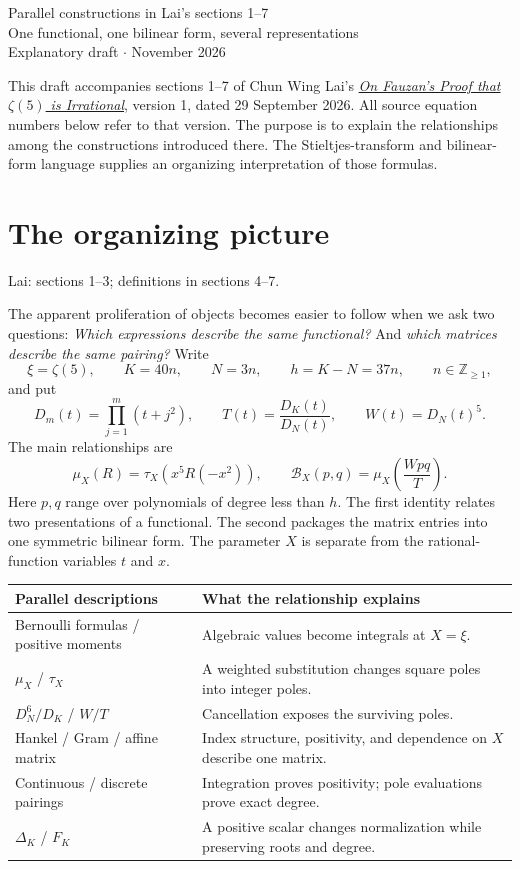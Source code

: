 \documentclass[11pt]{article}
\newcommand{\Z}{\mathbb Z}
\newcommand{\Bcal}{\mathcal B}
\newcommand{\source}[1]{{\small\color{blue!45!black}Lai: #1.}\par}
\newcommand{\pagetitle}[2]{\section*{#1}\source{#2}}
\begin{document}
\begin{center}
{\LARGE Parallel constructions in Lai's sections 1--7}\\[8pt]
{\large One functional, one bilinear form, several representations}\\[6pt]
Explanatory draft \enspace$\cdot$ November 2026
\end{center}

This draft accompanies sections 1--7 of Chun Wing Lai's
\href{https://ai.vixra.org/pdf/2609.0080v1.pdf}{\emph{On Fauzan's Proof that
$\zeta(5)$ is Irrational}}, version 1, dated 29 September 2026.
All source equation numbers below refer to that version. The purpose is to
explain the relationships among the constructions introduced there.
The Stieltjes-transform and bilinear-form language supplies an organizing
interpretation of those formulas.

\pagetitle{The organizing picture}{sections 1--3; definitions in sections 4--7}
The apparent proliferation of objects becomes easier to follow when we ask
two questions: \emph{Which expressions describe the same functional?}
And \emph{which matrices describe the same pairing?}
Write
\[
 \xi=\zeta(5),\qquad K=40n,\qquad N=3n,\qquad h=K-N=37n,
 \qquad n\in\Z_{\geq1},
\]
and put
\[
 D_m(t)=\prod_{j=1}^{m}(t+j^2),\qquad
 T(t)=\frac{D_K(t)}{D_N(t)},\qquad W(t)=D_N(t)^5.
\]
The main relationships are
\[
 \boxed{\mu_X(R)=\tau_X\!\left(x^5R(-x^2)\right)},\qquad
 \boxed{\Bcal_X(p,q)=\mu_X\!\left(\frac{Wpq}{T}\right)}.
\]
Here $p,q$ range over polynomials of degree less than $h$. The first identity
relates two presentations of a functional. The second packages the matrix
entries into one symmetric bilinear form. The parameter $X$ is separate from
the rational-function variables $t$ and $x$.

\begin{center}
\renewcommand{\arraystretch}{1.22}
\begin{tabular}{@{}p{}p{}@{}}
\toprule
Parallel descriptions & What the relationship explains \\
\midrule
Bernoulli formulas / positive moments & Algebraic values become integrals at $X=\xi$. \\
$\mu_X$ / $\tau_X$ & A weighted substitution changes square poles into integer poles. \\
$D_N^6/D_K$ / $W/T$ & Cancellation exposes the surviving poles. \\
Hankel / Gram / affine matrix & Index structure, positivity, and dependence on $X$ describe one matrix. \\
Continuous / discrete pairings & Integration proves positivity; pole evaluations prove exact degree. \\
$\Delta_K$ / $F_K$ & A positive scalar changes normalization while preserving roots and degree. \\
\bottomrule
\end{tabular}
\end{center}
\end{document}
